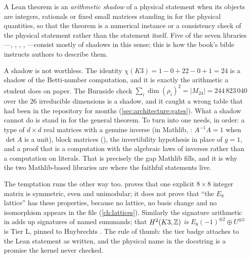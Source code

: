 \begin{definition}\label{def:architecture:shadow}
A Lean theorem is an \emph{arithmetic shadow} of a physical statement when its objects are
integers, rationals or fixed small matrices standing in for the physical quantities, so that
the theorem is a numerical instance or a consistency check of the physical statement rather
than the statement itself. Five of the seven libraries---,
, , ,
---consist mostly of shadows in this sense; this is how the book's
bible instructs authors to describe them.
\end{definition}

A shadow is not worthless. The identity $\chi(K3)=1-0+22-0+1=24$ is a shadow of the
Betti-number computation, and it is exactly the arithmetic a student does on paper. The
Burnside check $\sum_i \dim(\rho_i)^2 = |M_{24}| = 244\,823\,040$ over the 26 irreducible
dimensions is a shadow, and it caught a wrong table that had been in the repository for
months (\cref{sec:architecture:gates}). What a shadow cannot do is stand in for the general
theorem. To turn  into  one needs, in
order: a type of $d\times d$ real matrices with a genuine inverse (in Mathlib,
: $A^{-1}A=1$ when $\det A$ is a unit), block matrices (), the invertibility
hypothesis in place of $g=1$, and a proof that is a computation with the algebraic laws of
inverses rather than a computation on literals. That is precisely the gap Mathlib fills, and
it is why the two Mathlib-based libraries are where the faithful statements live.

\begin{pitfallbox}
The temptation runs the other way too.  proves that
one explicit $8\times8$ integer matrix is symmetric, even and unimodular; it does not prove
that ``the $E_8$ lattice'' has these properties, because no lattice, no basis change and no
isomorphism appears in the file (\cref{ch:lattices}). Similarly the signature arithmetic in
 adds up signatures of named summands; that $H^2(K3,\mathbb{Z})$ \emph{is}
$E_8(-1)^{\oplus2}\oplus U^{\oplus3}$ is Tier L, pinned to Huybrechts
. The rule of thumb: the tier badge attaches
to the Lean statement as written, and the physical name in the docstring is a promise the
kernel never checked.
\end{pitfallbox}

